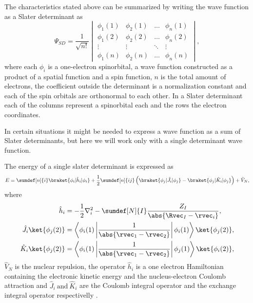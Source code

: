 \documentclass[../master_thesis.tex]{subfiles}
\begin{document}
The characteristics stated above can be summarized by writing the wave function as
a Slater determinant as \cite{Cramer:2004, Jensen:1999}
\begin{equation}
  \Psi_{SD} = \frac{1}{\sqrt{n!}}
  \begin{vmatrix}
    \phi_1(1) & \phi_2(1) & \ldots & \phi_n(1)\\
    \phi_1(2) & \phi_2(2) & \ldots & \phi_n(2)\\
    \vdots & \vdots & \ddots & \vdots \\
    \phi_1(n) & \phi_2(n) & \ldots & \phi_n(n)
  \end{vmatrix},
\end{equation}
where each $\phi_i$ is a one-electron spinorbital, a wave function constructed as
a product of a spatial function and a spin function\cite{Jensen:1999}, $n$ is the total amount of
electrons, the coefficient outside the determinant is a normalization constant
and each of the spin orbitals are orthonormal to each other. In a Slater determinant
each of the columns represent a spinorbital each and the rows the electron coordinates.

In certain situations it might be needed to express a wave function as a sum of Slater
determinants, but here we will work only with a single determinant wave function.

The energy of a single slater determinant is expressed as
\begin{equation}
  E = \sumdef[n]{i} \braket{\phi_i|\hat{h}_i|\phi_i} + \frac{1}{2} \sumdef[n]{ij}\left(\braket{\phi_j|\hat{J}_{i}|\phi_j} - \braket{\phi_j|\hat{K}_{i}|\phi_j}\right) + \hat{V}_{N}\text{,}
\end{equation}
where
\begin{align}
\hat{h}_i &= -\frac{1}{2}\nabla^2_i - \sumdef[N]{I}\frac{Z_I}{\abs{\Rvec_I - \rvec_i}},\\
\hat{J}_{i}\ket{\phi_j(2)} &= \left\langle\phi_i(1)\left|\frac{1}{\abs{\rvec_1 - \rvec_2}}\right|\phi_i(1)\right\rangle \ket{\phi_j(2)},\\
\hat{K}_{i}\ket{\phi_j(2)} &= \left\langle\phi_i(1)\left|\frac{1}{\abs{\rvec_1 - \rvec_2}}\right|\phi_j(1)\right\rangle\ket{\phi_i(2)},
\end{align}
$\hat{V}_N$ is the nuclear repulsion, the operator $\hat{h}_i$ is a one electron Hamiltonian
containing the electronic kinetic energy and the nucleus-electron Coulomb attraction and
 $\hat{J}_i\ \text{and}\ \hat{K}_i$ are the Coulomb integral operator and the exchange integral operator
 respectivelly \cite{Jensen:1999, Cramer:2004}.
\end{document}
